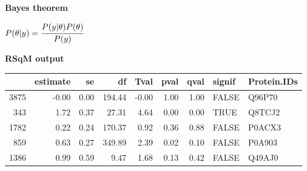 \documentclass[10pt, a4paper, twocolumn]{article} %
\begin{document}
\textbf{Bayes theorem}

$P(\theta | y) = \cfrac{P(y | \theta) P(\theta)}{P(y)}$


\textbf{RSqM output}

\begin{table}[ht]
\centering
\begin{tabular}{rrrrrrrll}
  \hline
 & estimate & se & df & Tval & pval & qval & signif & Protein.IDs \\ 
  \hline
3875 & -0.00 & 0.00 & 194.44 & -0.00 & 1.00 & 1.00 & FALSE & Q96P70 \\ 
  343 & 1.72 & 0.37 & 27.31 & 4.64 & 0.00 & 0.00 & TRUE & Q8TCJ2 \\ 
  1782 & 0.22 & 0.24 & 170.37 & 0.92 & 0.36 & 0.88 & FALSE & P0ACX3 \\ 
  859 & 0.63 & 0.27 & 349.89 & 2.39 & 0.02 & 0.10 & FALSE & P0A903 \\ 
  1386 & 0.99 & 0.59 & 9.47 & 1.68 & 0.13 & 0.42 & FALSE & Q49AJ0 \\ 
   \hline
\end{tabular}
\end{table}
\end{document}
